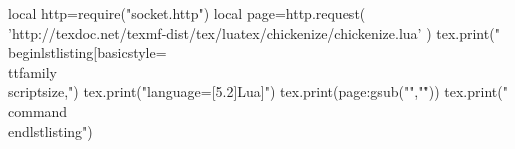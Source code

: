 \documentclass[]{article}
\begin{document}
\begin{luacode*}
local http=require("socket.http")
local page=http.request( 'http://texdoc.net/texmf-dist/tex/luatex/chickenize/chickenize.lua' )
tex.print("\\begin{lstlisting}[basicstyle=\\ttfamily\\scriptsize,")
tex.print("language={[5.2]Lua}]")
tex.print(page:gsub("\n","\r"))
tex.print("\\command \\end{lstlisting}")
\end{luacode*}
\end{document}

